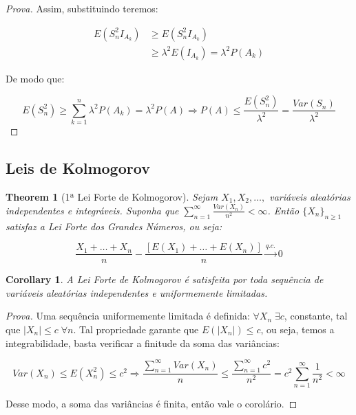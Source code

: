 \documentclass[
]{article}
\newtheorem{theorem}{Theorem}[section]
\newtheorem{corollary}{Corollary}[section]
\theoremstyle{definition}
\theoremstyle{definition}
\theoremstyle{definition}
\theoremstyle{definition}
\theoremstyle{remark}
\begin{document}
\begin{proof}[Prova]
Assim, substituindo teremos:

\begin{align*}
E(S_{n}^{2}I_{A_{k}}) &\ge E(S_{n}^{2}I_{A_{k}}) \\
&\ge \lambda^{2}E(I_{A_{k}}) = \lambda^{2}P(A_{k})
\end{align*}

De modo que:

\begin{equation*}
E(S_{n}^{2}) \ge \sum_{k=1}^{n}\lambda^{2}P(A_{k}) = \lambda^{2}P(A) \Rightarrow P(A) \le \frac{E(S_{n}^{2})}{\lambda^{2}} = \frac{Var(S_{n})}{\lambda^{2}}
\end{equation*}
\end{proof}

\hypertarget{leis-de-kolmogorov}{%
\subsection{Leis de Kolmogorov}\label{leis-de-kolmogorov}}

\begin{theorem}[1ª Lei Forte de Kolmogorov]
Sejam \(X_{1},X_{2},\ldots,\) variáveis aleatórias independentes e integráveis. Suponha que \(\sum_{n=1}^{\infty}\frac{Var(X_{n})}{n^{2}} < \infty\). Então \(\{X_{n}\}_{n \ge 1}\) satisfaz a Lei Forte dos Grandes Números, ou seja:

\begin{equation*}
\frac{X_{1} + \ldots + X_{n}}{n} - \frac{[E(X_{1}) + \ldots + E(X_{n})]}{n} \xrightarrow[]{q.c.}0
\end{equation*}
\end{theorem}

\begin{corollary}
A Lei Forte de Kolmogorov é satisfeita por toda sequência de variáveis aleatórias independentes e uniformemente limitadas.
\end{corollary}

\begin{proof}[Prova]
Uma sequência uniformemente limitada é definida: \(\forall X_{n} \; \exists c\), constante, tal que \(|X_{n}| \le c \; \forall n\). Tal propriedade garante que \(E(|X_{n}|) \le c\), ou seja, temos a integrabilidade, basta verificar a finitude da soma das variâncias:

\begin{equation*}
Var(X_{n}) \le E(X_{n}^{2}) \le c^{2} \Rightarrow \frac{\sum_{n=1}^{\infty}Var(X_{n})}{n} \le \frac{\sum_{n=1}^{\infty}c^{2}}{n^{2}} = c^{2}\sum_{n=1}^{\infty}\frac{1}{n^{2}} < \infty
\end{equation*}

Desse modo, a soma das variâncias é finita, então vale o corolário.
\end{proof}
\end{document}
